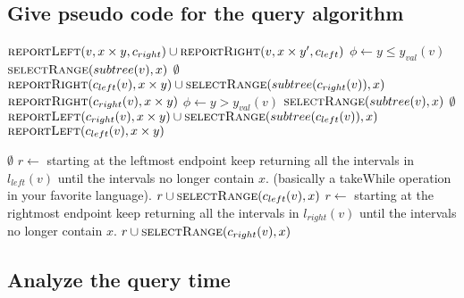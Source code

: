 \documentclass{article}
\begin{document}
\subsection{Give pseudo code for the query algorithm}
\begin{algorithmic}[1]
			\State
			\Return {}
		\EndIf
		\State
		\Return {}
		\EndIf
		\State
		\Return {}
		\EndIf
		\State
		\State
		\Return $\Call{reportLeft}{v, x\times y, c_{right}}\cup
		\Call{reportRight}{v,x\times y', c_{left}}$
	\EndFunction
		\State
		$\phi \gets y \leq y_{val}(v)$
			\If{$\phi$}
				\State
				\Return $\Call{selectRange}{subtree(v),x}$
			\EndIf
			\State
			\Return $\emptyset$
		\EndIf
		\If{$\phi$}
		\State
		\Return $\Call{reportRight}{c_{left}(v), x \times y} \cup
		\Call{selectRange}{subtree(c_{right}(v)),x}$
		\EndIf
		\State
		\Return $\Call{reportRight}{c_{right}(v), x \times y}$
	\EndFunction
		\State
		$\phi \gets y > y_{val}(v)$
			\If{$\phi$}
				\State
				\Return $\Call{selectRange}{subtree(v),x}$
			\EndIf
			\State
			\Return $\emptyset$
		\EndIf
		\If{$\phi$}
		\State
		\Return $\Call{reportLeft}{c_{right}(v), x \times y} \cup
		\Call{selectRange}{subtree(c_{left}(v)),x}$
		\EndIf
		\State
		\Return $\Call{reportLeft}{c_{left}(v), x \times y}$
	\EndFunction
\end{algorithmic}
\newpage
\begin{algorithmic}[1]
		\State
		\Return $\emptyset$
	\EndIf
		\State
		$r \gets $ starting at the leftmost endpoint keep
		returning all the intervals in $l_{left}(v)$ until the
		intervals no longer contain $x$. (basically a takeWhile
		operation in your favorite language).
		\State
		\Return $r \cup \Call{selectRange}{c_{left}(v),x}$
	\EndIf
	\State
	$r \gets $ starting at the rightmost endpoint keep
	returning all the intervals in $l_{right}(v)$ until the
	intervals no longer contain $x$.
	\State
	\Return $r \cup \Call{selectRange}{c_{right}(v),x}$
	\EndFunction
\end{algorithmic}
\subsection{Analyze the query time}
\end{document}
